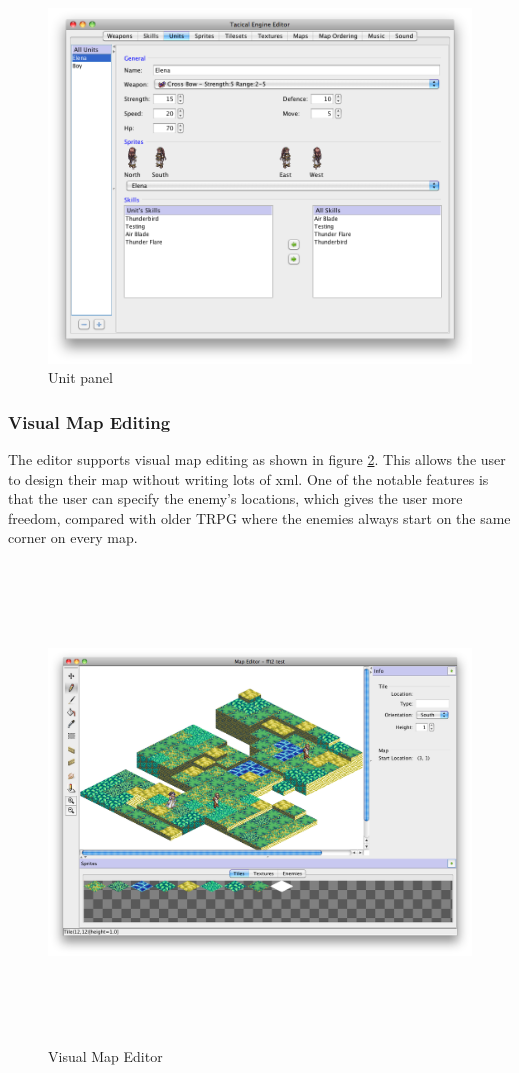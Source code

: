  \begin{figure}[htbp]
 	\centering
 		\includegraphics[scale=0.3]{figures/editor/Units.png}
 	\caption{Unit panel}
 	\label{fig:figures_editor_Unitsd}
 \end{figure}
 
\clearpage
\subsubsection{Visual Map Editing}
The editor supports visual map editing as shown in figure \ref{fig:figures_editor_Map}.  This allows the user to design their map without writing lots of xml. One of the notable features is that the user can specify the enemy's locations, which gives the user more freedom, compared with older TRPG where the enemies always start on the same corner on every map.  

\begin{figure}[htbp]
	\centering
		\includegraphics[height=5in]{figures/editor/Map.png}
	\caption{Visual Map Editor}
	\label{fig:figures_editor_Map}
\end{figure}

